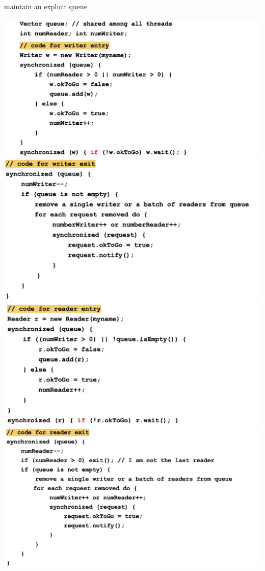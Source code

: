 \documentclass[10pt, landscape]{article}
\begin{document}
\begin{multicols*}{3}
  maintain an explicit queue

  \begin{tightcenter}
    \includegraphics[width=0.9\linewidth]{cs4231-reader-writer-no-starvation-1.png} 
    \includegraphics[width=0.9\linewidth]{cs4231-reader-writer-no-starvation-2.png} 
    \includegraphics[width=0.9\linewidth]{cs4231-reader-writer-no-starvation-3.png} 
    \includegraphics[width=0.9\linewidth]{cs4231-reader-writer-no-starvation-4.png} 
  \end{tightcenter}


\end{multicols*}
\end{document}
